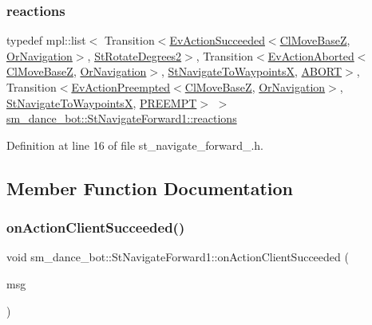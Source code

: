 \subsubsection{\texorpdfstring{reactions}{reactions}}
{\footnotesize\ttfamily typedef mpl\+::list$<$ Transition$<$\hyperlink{structsmacc_1_1default__events_1_1EvActionSucceeded}{Ev\+Action\+Succeeded}$<$\hyperlink{classcl__move__base__z_1_1ClMoveBaseZ}{Cl\+Move\+BaseZ}, \hyperlink{classsm__dance__bot_1_1OrNavigation}{Or\+Navigation}$>$, \hyperlink{structsm__dance__bot_1_1StRotateDegrees2}{St\+Rotate\+Degrees2}$>$, Transition$<$\hyperlink{structsmacc_1_1default__events_1_1EvActionAborted}{Ev\+Action\+Aborted}$<$\hyperlink{classcl__move__base__z_1_1ClMoveBaseZ}{Cl\+Move\+BaseZ}, \hyperlink{classsm__dance__bot_1_1OrNavigation}{Or\+Navigation}$>$, \hyperlink{structsm__dance__bot_1_1StNavigateToWaypointsX}{St\+Navigate\+To\+WaypointsX}, \hyperlink{structsmacc_1_1default__transition__tags_1_1ABORT}{A\+B\+O\+RT}$>$, Transition$<$\hyperlink{structsmacc_1_1default__events_1_1EvActionPreempted}{Ev\+Action\+Preempted}$<$\hyperlink{classcl__move__base__z_1_1ClMoveBaseZ}{Cl\+Move\+BaseZ}, \hyperlink{classsm__dance__bot_1_1OrNavigation}{Or\+Navigation}$>$, \hyperlink{structsm__dance__bot_1_1StNavigateToWaypointsX}{St\+Navigate\+To\+WaypointsX}, \hyperlink{structsmacc_1_1default__transition__tags_1_1PREEMPT}{P\+R\+E\+E\+M\+PT}$>$ $>$ \hyperlink{structsm__dance__bot_1_1StNavigateForward1_a4a49d0c774d44f96b17ceac4c6628104}{sm\+\_\+dance\+\_\+bot\+::\+St\+Navigate\+Forward1\+::reactions}}



Definition at line 16 of file st\+\_\+navigate\+\_\+forward\+\_.\+h.



\subsection{Member Function Documentation}
\mbox{\label{structsm__dance__bot_1_1StNavigateForward1_ab5af8fd66b5c39ffef4829233d449d55}} 
\subsubsection{\texorpdfstring{on\+Action\+Client\+Succeeded()}{onActionClientSucceeded()}}
{\footnotesize\ttfamily void sm\+\_\+dance\+\_\+bot\+::\+St\+Navigate\+Forward1\+::on\+Action\+Client\+Succeeded (\begin{DoxyParamCaption}\item[{\hyperlink{classcl__move__base__z_1_1ClMoveBaseZ_a99373d0c15ae96684462d8677f5fd632}{Cl\+Move\+Base\+Z\+::\+Result\+Const\+Ptr} \&}]{msg }\end{DoxyParamCaption})\hspace{0.3cm}{\ttfamily [inline]}}



